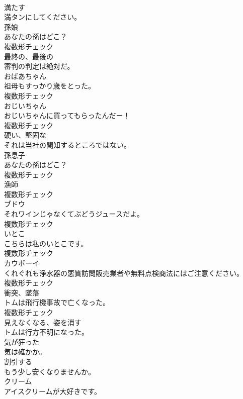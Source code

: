 \documentclass[8pt]{extreport}
\begin{document}
\begin{CJK}{UTF8}{min}
\\	[動詞]	満たす	
\\	満タンにしてください。	
\\	[名詞]	孫娘	
\\	あなたの孫はどこ？	
\\	複数形チェック
\\	[形容詞]	最終の、最後の	
\\	審判の判定は絶対だ。	
\\	[名詞]	おばあちゃん	
\\	祖母もすっかり歳をとった。	
\\	複数形チェック
\\	[名詞]	おじいちゃん	
\\	おじいちゃんに買ってもらったんだー！	
\\	複数形チェック
\\	[形容詞]	硬い、堅固な	
\\	それは当社の関知するところではない。	
\\	[名詞]	孫息子	
\\	あなたの孫はどこ？	
\\	複数形チェック
\\	[名詞]	漁師	
\\	複数形チェック
\\	[名詞]	ブドウ	
\\	それワインじゃなくてぶどうジュースだよ。	
\\	複数形チェック
\\	[名詞]	いとこ	
\\	こちらは私のいとこです。	
\\	複数形チェック
\\	[名詞]	カウボーイ	
\\	くれぐれも浄水器の悪質訪問販売業者や無料点検商法にはご注意ください。	
\\	複数形チェック
\\	[名詞]	衝突、墜落	
\\	トムは飛行機事故で亡くなった。	
\\	複数形チェック
\\	[動詞]	見えなくなる、姿を消す	
\\	トムは行方不明になった。	
\\	[形容詞]	気が狂った	
\\	気は確かか。	
\\	[動詞]	割引する	
\\	もう少し安くなりませんか。	
\\	[名詞]	クリーム	
\\	アイスクリームが大好きです。	

\end{CJK}
\end{document}
